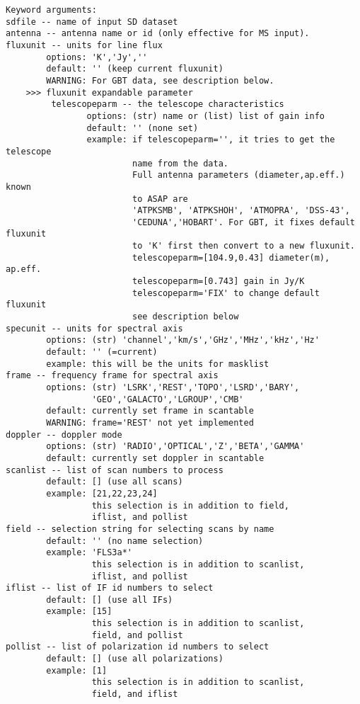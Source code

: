 \begin{verbatim}
Keyword arguments:
sdfile -- name of input SD dataset
antenna -- antenna name or id (only effective for MS input). 
fluxunit -- units for line flux
        options: 'K','Jy',''
        default: '' (keep current fluxunit)
        WARNING: For GBT data, see description below.
    >>> fluxunit expandable parameter
         telescopeparm -- the telescope characteristics
                options: (str) name or (list) list of gain info
                default: '' (none set)
                example: if telescopeparm='', it tries to get the telescope
                         name from the data.
                         Full antenna parameters (diameter,ap.eff.) known
                         to ASAP are
                         'ATPKSMB', 'ATPKSHOH', 'ATMOPRA', 'DSS-43',
                         'CEDUNA','HOBART'. For GBT, it fixes default fluxunit
                         to 'K' first then convert to a new fluxunit.
                         telescopeparm=[104.9,0.43] diameter(m), ap.eff.
                         telescopeparm=[0.743] gain in Jy/K
                         telescopeparm='FIX' to change default fluxunit
                         see description below
specunit -- units for spectral axis
        options: (str) 'channel','km/s','GHz','MHz','kHz','Hz'
        default: '' (=current)
        example: this will be the units for masklist
frame -- frequency frame for spectral axis
        options: (str) 'LSRK','REST','TOPO','LSRD','BARY',
                 'GEO','GALACTO','LGROUP','CMB'
        default: currently set frame in scantable
        WARNING: frame='REST' not yet implemented
doppler -- doppler mode
        options: (str) 'RADIO','OPTICAL','Z','BETA','GAMMA'
        default: currently set doppler in scantable
scanlist -- list of scan numbers to process
        default: [] (use all scans)
        example: [21,22,23,24]
                 this selection is in addition to field,
                 iflist, and pollist
field -- selection string for selecting scans by name
        default: '' (no name selection)
        example: 'FLS3a*'
                 this selection is in addition to scanlist,
                 iflist, and pollist
iflist -- list of IF id numbers to select
        default: [] (use all IFs)
        example: [15]
                 this selection is in addition to scanlist,
                 field, and pollist
pollist -- list of polarization id numbers to select
        default: [] (use all polarizations)
        example: [1]
                 this selection is in addition to scanlist,
                 field, and iflist

\end{verbatim}
